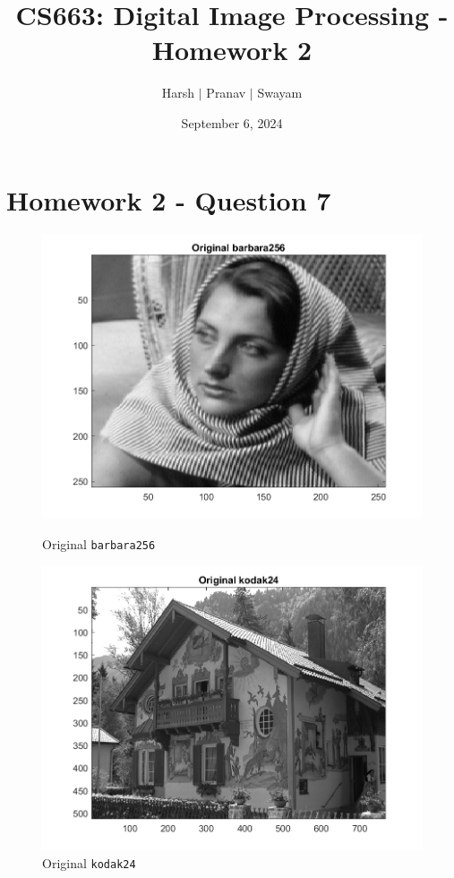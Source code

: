 \documentclass{article}
\title{CS663: Digital Image Processing - Homework 2}
\author{Harsh $\vert$ Pranav $\vert$ Swayam}
\date{September 6, 2024}
\begin{document}
\maketitle
\section{Homework 2 - Question 7}

\begin{figure}[!htb]
    \centering
    \begin{minipage}[b]{0.45\textwidth}
        \includegraphics[width=\textwidth]{barbara256_orig.png}
        \caption{Original \texttt{barbara256}}
    \end{minipage}
    \begin{minipage}[b]{0.45\textwidth}
        \includegraphics[width=\textwidth]{kodak24_orig.png}
        \caption{Original \texttt{kodak24}}
    \end{minipage}
\end{figure}
\end{document}
